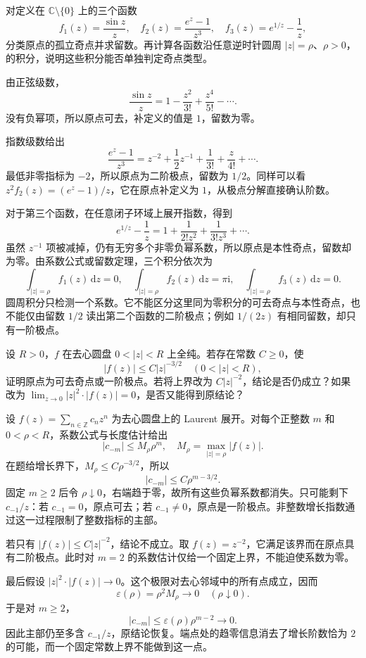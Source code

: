 \begin{exercise}\label{b3:ex:03-2}
对定义在 \(\mathbb C\setminus\{0\}\) 上的三个函数
\[
  f_1(z)=\frac{\sin z}{z},
  \quad f_2(z)=\frac{e^z-1}{z^3},
  \quad f_3(z)=e^{1/z}-\frac1z,
\]
分类原点的孤立奇点并求留数。再计算各函数沿任意逆时针圆周 \(|z|=\rho\)、\(\rho>0\)，的积分，说明这些积分能否单独判定奇点类型。
\end{exercise}
\begin{solution}
由正弦级数，
\[
  \frac{\sin z}{z}=1-\frac{z^2}{3!}
                    +\frac{z^4}{5!}-\cdots.
\]
没有负幂项，所以原点可去，补定义的值是 \(1\)，留数为零。

指数级数给出
\[
  \frac{e^z-1}{z^3}
  =z^{-2}+\frac12z^{-1}+\frac1{3!}
    +\frac z{4!}+\cdots.
\]
最低非零指标为 \(-2\)，所以原点为二阶极点，留数为 \(1/2\)。同样可以看
\(z^2f_2(z)=(e^z-1)/z\)，它在原点补定义为 \(1\)，从极点分解直接确认阶数。

对于第三个函数，在任意闭子环域上展开指数，得到
\[
  e^{1/z}-\frac1z
  =1+\frac1{2!z^2}+\frac1{3!z^3}+\cdots.
\]
虽然 \(z^{-1}\) 项被减掉，仍有无穷多个非零负幂系数，所以原点是本性奇点，留数却为零。由系数公式或留数定理，三个积分依次为
\[
  \int_{|z|=\rho}f_1(z)\,\mathrm{d}z=0,
  \quad\int_{|z|=\rho}f_2(z)\,\mathrm{d}z=\pi\mathrm{i},
  \quad\int_{|z|=\rho}f_3(z)\,\mathrm{d}z=0.
\]
圆周积分只检测一个系数。它不能区分这里同为零积分的可去奇点与本性奇点，也不能仅由留数 \(1/2\) 读出第二个函数的二阶极点；例如 \(1/(2z)\) 有相同留数，却只有一阶极点。
\end{solution}

\begin{exercise}\label{b3:ex:03-3}
设 \(R>0\)，\(f\) 在去心圆盘 \(0<|z|<R\) 上全纯。若存在常数 \(C\ge0\)，使
\[
  |f(z)|\le C|z|^{-3/2}\quad(0<|z|<R),
\]
证明原点为可去奇点或一阶极点。若将上界改为 \(C|z|^{-2}\)，结论是否仍成立？如果改为
\(\lim_{z\to0}|z|^2\cdot|f(z)|=0\)，是否又能得到原结论？
\end{exercise}
\begin{solution}
设 \(f(z)=\sum_{n\in\mathbb Z}c_nz^n\) 为去心圆盘上的 Laurent 展开。对每个正整数 \(m\) 和 \(0<\rho<R\)，系数公式与长度估计给出
\[
  |c_{-m}|\le M_\rho\rho^m,
  \quad M_\rho=\max_{|z|=\rho}|f(z)|.
\]
在题给增长界下，\(M_\rho\le C\rho^{-3/2}\)，所以
\[
  |c_{-m}|\le C\rho^{m-3/2}.
\]
固定 \(m\ge2\) 后令 \(\rho\downarrow0\)，右端趋于零，故所有这些负幂系数都消失。只可能剩下 \(c_{-1}/z\)：若 \(c_{-1}=0\)，原点可去；若 \(c_{-1}\ne0\)，原点是一阶极点。非整数增长指数通过这一过程限制了整数指标的主部。

若只有 \(|f(z)|\le C|z|^{-2}\)，结论不成立。取 \(f(z)=z^{-2}\)，它满足该界而在原点具有二阶极点。此时对 \(m=2\) 的系数估计仅给一个固定上界，不能迫使系数为零。

最后假设 \(|z|^2\cdot|f(z)|\to0\)。这个极限对去心邻域中的所有点成立，因而
\[
  \varepsilon(\rho)=\rho^2M_\rho\longrightarrow0
  \quad(\rho\downarrow0).
\]
于是对 \(m\ge2\)，
\[
  |c_{-m}|\le\varepsilon(\rho)\rho^{m-2}\longrightarrow0.
\]
因此主部仍至多含 \(c_{-1}/z\)，原结论恢复。端点处的趋零信息消去了增长阶数恰为 \(2\) 的可能，而一个固定常数上界不能做到这一点。
\end{solution}

